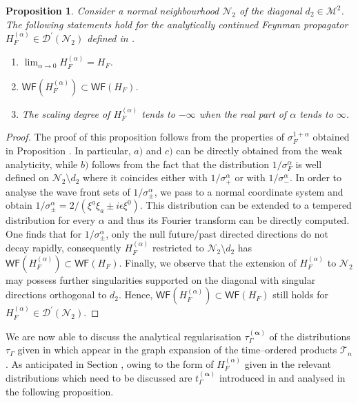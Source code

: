 \documentclass[10pt]{book}
\newcommand{\WF}{\mathsf{WF}}
\newcommand{\Dcal}{\mathcal{D}}
\newcommand{\Mcal}{\mathcal{M}}
\newcommand{\Ncal}{\mathcal{N}}
\theoremstyle{break}
\newtheorem{proposition}{Proposition}
\newtheorem{proof}{Proof}
\begin{document}
\begin{proposition}
Consider a normal neighbourhood $\Ncal_2$ of the diagonal $d_2\in\Mcal^2$. The following statements hold for the analytically continued Feynman propagator $H^{(\alpha)}_F\in\Dcal^\prime(\Ncal_2)$ defined in %
.
\begin{enumerate}
\item $\lim_{\alpha\to 0}H^{(\alpha)}_F= H_F$. 
\item $\WF(H^{(\alpha)}_F) \subset \WF(H_F)$.
\item The scaling degree of $H^{(\alpha)}_F$ tends to $-\infty$ when the real part of $\alpha$ tends to $\infty$.  
\end{enumerate}
\end{proposition}
\begin{proof}
The proof of this proposition follows from the properties of $\sigma_F^{1+\alpha}$ obtained in Proposition %
. In particular, $a)$ and $c)$ can be directly obtained from the weak analyticity, while $b)$ follows from the fact that the distribution $1/\sigma_F^\alpha$ is well defined on $\Ncal_2\setminus d_2$ where it coincides either with $1/\sigma_+^\alpha$ or with $1/\sigma_-^\alpha$. 
In order to analyse the wave front sets of $1/\sigma_\pm^\alpha$, we pass to a normal coordinate system and obtain $1/\sigma_\pm^\alpha=2/(\xi^a\xi_a\pm i\epsilon \xi^0)$. This distribution can be extended to a tempered  distribution for every $\alpha$ and thus its Fourier transform can be directly computed. One finds that for $1/\sigma_\pm^\alpha$, only the null future/past directed directions do not decay rapidly, consequently $H_F^{(\alpha)}$ restricted to $\Ncal_2\setminus d_2$ has $\WF(H^{(\alpha)}_F)\subset \WF(H_F)$. Finally, we observe that the extension of $H^{(\alpha)}_F$ to $\Ncal_2$ may possess further singularities supported on the diagonal with singular directions orthogonal to $d_2$. Hence, $\WF(H^{(\alpha)}_F)\subset \WF(H_F)$ still holds for $H_F^{(\alpha)}\in\Dcal^\prime(\Ncal_2)$.
\end{proof}

We are now able to discuss the analytical regularisation $\tau^{(\boldsymbol{\alpha})}_\Gamma$ %
of the distributions $\tau_
\Gamma$ given in %
which appear in the graph expansion %
of the time--ordered products $\mathcal{T}_n$ %
. As anticipated in Section %
, owing to the form of $H^{(\alpha)}_F$ given in %
the relevant distributions which need to be discussed are $t^{(\boldsymbol{\alpha})}_\Gamma$ introduced in %
and analysed in the following proposition.
\end{document}

